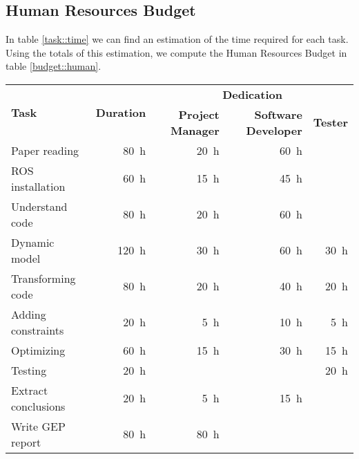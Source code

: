 \subsection{Human Resources Budget}
In table \ref{task::time} we can find an estimation of the time required for each task. Using the totals of this estimation, we compute the Human Resources Budget in table \ref{budget::human}.

\begin{table}[H]
	\begin{center}
		\begin{tabular}{|l|r|r|r|r|}
			\hline
			\multirow{2}{*}{\bf Task} & \multirow{2}{*}{\bf Duration} & \multicolumn{3}{c|}{\bf Dedication}\\\cline{3-5}
			& & \bf Project Manager & \bf Software Developer & \bf Tester\\\hline\hline
			
			Paper reading & \SI{80}{\hour}& \SI{20}{\hour} & \SI{60}{\hour} & \\\hline
			
			ROS installation & \SI{60}{\hour}& \SI{15}{\hour} & \SI{45}{\hour} & \\\hline
			
			Understand code & \SI{80}{\hour}&  \SI{20}{\hour}&  \SI{60}{\hour}& \\\hline
			
			Dynamic model & \SI{120}{\hour}& \SI{30}{\hour} & \SI{60}{\hour} & \SI{30}{\hour} \\\hline
			
			Transforming code & \SI{80}{\hour}& \SI{20}{\hour} & \SI{40}{\hour} & \SI{20}{\hour} \\\hline
			
			Adding constraints & \SI{20}{\hour}& \SI{5}{\hour} & \SI{10}{\hour} & \SI{5}{\hour} \\\hline
			
			Optimizing & \SI{60}{\hour}& \SI{15}{\hour} & \SI{30}{\hour} & \SI{15}{\hour} \\\hline
			
			Testing & \SI{20}{\hour}& & & \SI{20}{\hour} \\\hline
			
			Extract conclusions & \SI{20}{\hour}& \SI{5}{\hour} & \SI{15}{\hour} & \\\hline
			
			Write GEP report & \SI{80}{\hour}& \SI{80}{\hour} & & \\\hline
			

\end{tabular}
\end{center}
\end{table}
